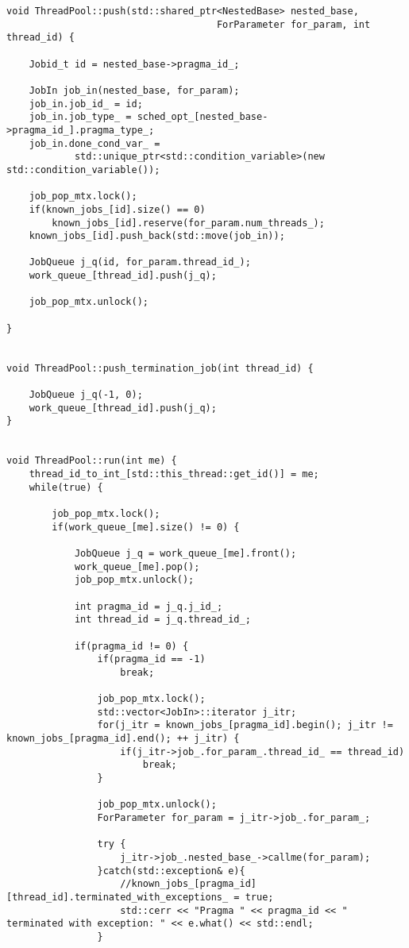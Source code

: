 \documentclass[a4paper,11pt,twoside]{book}
\begin{document}
\begin{lstlisting}[language=CCC, caption=thread\_pool.cpp]
void ThreadPool::push(std::shared_ptr<NestedBase> nested_base,
                                     ForParameter for_param, int thread_id) {
    
    Jobid_t id = nested_base->pragma_id_;
        
    JobIn job_in(nested_base, for_param);
    job_in.job_id_ = id;
    job_in.job_type_ = sched_opt_[nested_base->pragma_id_].pragma_type_;
    job_in.done_cond_var_ =
            std::unique_ptr<std::condition_variable>(new std::condition_variable());
       
    job_pop_mtx.lock();
    if(known_jobs_[id].size() == 0)
        known_jobs_[id].reserve(for_param.num_threads_);
    known_jobs_[id].push_back(std::move(job_in));

    JobQueue j_q(id, for_param.thread_id_);
    work_queue_[thread_id].push(j_q);
    
    job_pop_mtx.unlock();

}


void ThreadPool::push_termination_job(int thread_id) {

    JobQueue j_q(-1, 0);
    work_queue_[thread_id].push(j_q);
}


void ThreadPool::run(int me) {
    thread_id_to_int_[std::this_thread::get_id()] = me;
    while(true) {
        
        job_pop_mtx.lock();
        if(work_queue_[me].size() != 0) {

            JobQueue j_q = work_queue_[me].front();
            work_queue_[me].pop();
            job_pop_mtx.unlock();
            
            int pragma_id = j_q.j_id_;
            int thread_id = j_q.thread_id_;

            if(pragma_id != 0) {
                if(pragma_id == -1)
                    break;
                
                job_pop_mtx.lock();
                std::vector<JobIn>::iterator j_itr;
                for(j_itr = known_jobs_[pragma_id].begin(); j_itr != known_jobs_[pragma_id].end(); ++ j_itr) {
                    if(j_itr->job_.for_param_.thread_id_ == thread_id)
                        break;
                }
               
                job_pop_mtx.unlock();
                ForParameter for_param = j_itr->job_.for_param_;
                
                try {
                    j_itr->job_.nested_base_->callme(for_param);
                }catch(std::exception& e){
                    //known_jobs_[pragma_id][thread_id].terminated_with_exceptions_ = true;
                    std::cerr << "Pragma " << pragma_id << " terminated with exception: " << e.what() << std::endl;
                }



\end{lstlisting}
\end{document}
